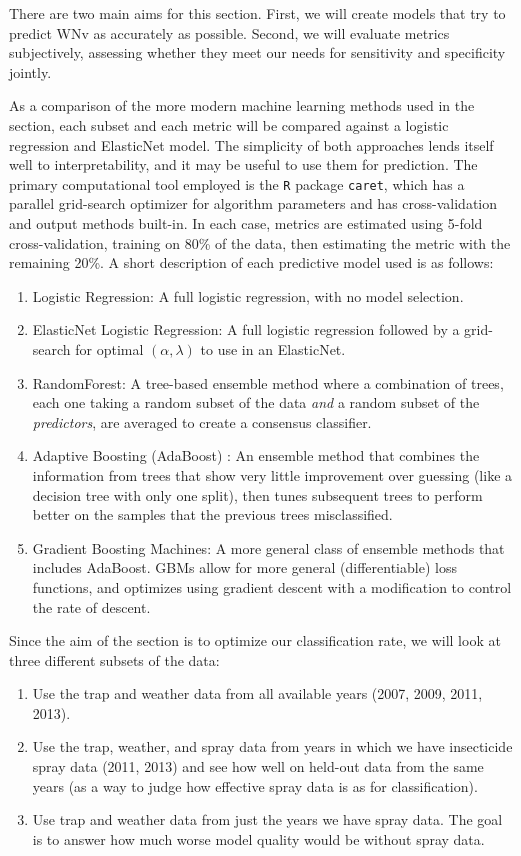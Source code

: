 \documentclass[12pt]{article}
\begin{document}
There are two main aims for this section. First, we will create models that try to predict WNv as accurately as possible. Second, we will evaluate metrics subjectively, assessing whether they meet our needs for sensitivity and specificity jointly. 

As a comparison of the more modern machine learning methods used in the section, each subset and each metric will be compared against a logistic regression and ElasticNet model. The simplicity of both approaches lends itself well to interpretability, and it may be useful to use them for prediction. The primary computational tool employed is the \verb+R+ package \verb+caret+, which has a parallel grid-search optimizer for algorithm parameters and has cross-validation and output methods built-in. In each case, metrics are estimated using 5-fold cross-validation, training on 80\% of the data, then estimating the metric with the remaining 20\%. 
A short description of each predictive model used is as follows:
\begin{enumerate}
\item Logistic Regression: A full logistic regression, with no model selection.
\item ElasticNet Logistic Regression: A full logistic regression followed by a grid-search for optimal $(\alpha, \lambda)$ to use in an ElasticNet.
\item RandomForest\cite{breiman2001random}: A tree-based ensemble method where a combination of trees, each one taking a random subset of the data \emph{and} a random subset of the \emph{predictors}, are averaged to create a consensus classifier.
\item Adaptive Boosting (AdaBoost) \cite{Schapire99improvedboosting}: An ensemble method that combines the information from trees that show very little improvement over guessing (like a decision tree with only one split), then tunes subsequent trees to perform better on the samples that the previous trees misclassified.
\item Gradient Boosting Machines\cite{friedman2001greedy}: A more general class of ensemble methods that includes AdaBoost. GBMs allow for more general (differentiable) loss functions, and optimizes using gradient descent with a modification to control the rate of descent.
\end{enumerate}

Since the aim of the section is to optimize our classification rate, we will look at three different subsets of the data:
\begin{enumerate}
\item Use the trap and weather data from all available years (2007, 2009, 2011, 2013).
\item Use the trap, weather, and spray data from years in which we have insecticide spray data (2011, 2013) and see how well on held-out data from the same years (as a way to judge how effective spray data is as for classification).
\item Use trap and weather data from just the years we have spray data. The goal is to answer how much worse model quality would be without spray data.
\end{enumerate}
\end{document}
